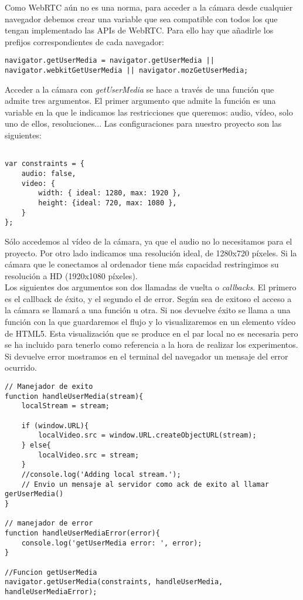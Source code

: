 Como WebRTC aún no es una norma, para acceder a la cámara desde cualquier navegador debemos crear una variable que sea compatible con todos los que tengan implementado las APIs de WebRTC. Para ello hay que añadirle los prefijos correspondientes de cada navegador:\\


\begin{lstlisting}[caption=Variable de getUserMedia.]
navigator.getUserMedia = navigator.getUserMedia || navigator.webkitGetUserMedia || navigator.mozGetUserMedia;
\end{lstlisting}


Acceder a la cámara  con \emph{getUserMedia} se hace a través de una función que admite tres argumentos. El primer argumento que admite la función es una variable en la que le indicamos las restricciones que queremos: audio, vídeo, solo uno de ellos, resoluciones... Las configuraciones para nuestro proyecto son las siguientes:\\

\begin{lstlisting}[caption=Restricciones de getUserMedia]

var constraints = {
    audio: false,
    video: {
        width: { ideal: 1280, max: 1920 },
        height: {ideal: 720, max: 1080 },
    }
};

\end{lstlisting}

Sólo accedemos al vídeo de la cámara, ya que el audio no lo necesitamos para el proyecto. Por otro lado indicamos una resolución ideal, de 1280x720 píxeles. Si la cámara que le conectamos al ordenador tiene más capacidad restringimos su resolución a HD (1920x1080 píxeles).\\

Los siguientes dos argumentos son dos llamadas de vuelta o \emph{callbacks}. El primero es el callback de éxito, y el segundo el de error. Según sea de exitoso el acceso a la cámara se llamará a una función u otra. Si nos devuelve éxito se llama a una función con la que guardaremos el flujo y lo visualizaremos en un elemento vídeo de HTML5. Esta visualización que se produce en el par local no es necesaria pero se ha incluido para tenerlo como referencia a la hora de realizar los experimentos. Si devuelve error mostramos en el terminal del navegador un mensaje del error ocurrido.\\

\begin{lstlisting}[caption={getUserMedia.}, label={lst:getusermedia}]
// Manejador de exito
function handleUserMedia(stream){
	localStream = stream;

	if (window.URL){
		localVideo.src = window.URL.createObjectURL(stream);
	} else{
		localVideo.src = stream;
	}
	//console.log('Adding local stream.');
	// Envio un mensaje al servidor como ack de exito al llamar gerUserMedia()	
}

// manejador de error
function handleUserMediaError(error){
	console.log('getUserMedia error: ', error);
}

//Funcion getUserMedia
navigator.getUserMedia(constraints, handleUserMedia, handleUserMediaError); 
\end{lstlisting}

